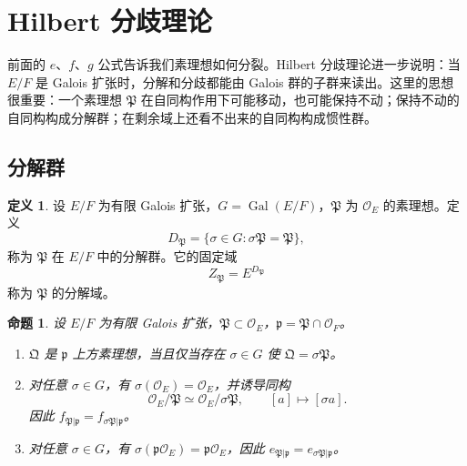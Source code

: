 \documentclass[11pt,a4paper,openany]{ctexbook}
\numberwithin{equation}{chapter}
\newcommand{\OF}{\mathcal{O}_F}
\newcommand{\Gal}{\operatorname{Gal}}
\theoremstyle{plain}
\newtheorem{proposition}[theorem]{命题}
\theoremstyle{definition}
\newtheorem{definition}[theorem]{定义}
\theoremstyle{remark}
\begin{document}
\section{Hilbert 分歧理论}

前面的 $e$、$f$、$g$ 公式告诉我们素理想如何分裂。Hilbert 分歧理论进一步说明：当 $E/F$ 是 Galois 扩张时，分解和分歧都能由 Galois 群的子群来读出。这里的思想很重要：一个素理想 $\mathfrak P$ 在自同构作用下可能移动，也可能保持不动；保持不动的自同构构成分解群；在剩余域上还看不出来的自同构构成惯性群。

\subsection{分解群}

\begin{definition}
设 $E/F$ 为有限 Galois 扩张，$G=\Gal(E/F)$，$\mathfrak P$ 为 $\mathcal O_E$ 的素理想。定义
\[
D_{\mathfrak P}=\{\sigma\in G:\sigma\mathfrak P=\mathfrak P\},
\]
称为 $\mathfrak P$ 在 $E/F$ 中的分解群。它的固定域
\[
Z_{\mathfrak P}=E^{D_{\mathfrak P}}
\]
称为 $\mathfrak P$ 的分解域。
\end{definition}

\begin{proposition}
设 $E/F$ 为有限 Galois 扩张，$\mathfrak P\subset\mathcal O_E$，$\mathfrak p=\mathfrak P\cap\OF$。
\begin{enumerate}[label=(\arabic*)]
\item $\mathfrak Q$ 是 $\mathfrak p$ 上方素理想，当且仅当存在 $\sigma\in G$ 使 $\mathfrak Q=\sigma\mathfrak P$。
\item 对任意 $\sigma\in G$，有 $\sigma(\mathcal O_E)=\mathcal O_E$，并诱导同构
\[
\mathcal O_E/\mathfrak P\simeq\mathcal O_E/\sigma\mathfrak P,\qquad
[a]\longmapsto[\sigma a].
\]
因此 $f_{\mathfrak P|\mathfrak p}=f_{\sigma\mathfrak P|\mathfrak p}$。
\item 对任意 $\sigma\in G$，有 $\sigma(\mathfrak p\mathcal O_E)=\mathfrak p\mathcal O_E$，因此
$e_{\mathfrak P|\mathfrak p}=e_{\sigma\mathfrak P|\mathfrak p}$。
\end{enumerate}
\end{proposition}
\end{document}
